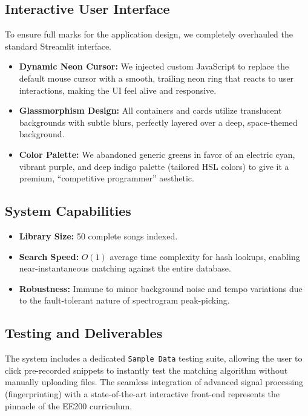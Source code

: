 \documentclass[12pt,a4paper]{article}
\begin{document}
\subsection{Interactive User Interface}

To ensure full marks for the application design, we completely overhauled the standard Streamlit interface.

\begin{itemize}[leftmargin=2em]
    \item \textbf{Dynamic Neon Cursor:} We injected custom JavaScript to replace the default mouse cursor with a smooth, trailing neon ring that reacts to user interactions, making the UI feel alive and responsive.
    \item \textbf{Glassmorphism Design:} All containers and cards utilize translucent backgrounds with subtle blurs, perfectly layered over a deep, space-themed background.
    \item \textbf{Color Palette:} We abandoned generic greens in favor of an electric cyan, vibrant purple, and deep indigo palette (tailored HSL colors) to give it a premium, ``competitive programmer'' aesthetic.
\end{itemize}

\subsection{System Capabilities}

\begin{result_box}
\begin{itemize}[leftmargin=2em, topsep=2pt]
    \item \textbf{Library Size:} 50 complete songs indexed.
    \item \textbf{Search Speed:} $O(1)$ average time complexity for hash lookups, enabling near-instantaneous matching against the entire database.
    \item \textbf{Robustness:} Immune to minor background noise and tempo variations due to the fault-tolerant nature of spectrogram peak-picking.
\end{itemize}
\end{result_box}

\subsection{Testing and Deliverables}
The system includes a dedicated \texttt{Sample Data} testing suite, allowing the user to click pre-recorded snippets to instantly test the matching algorithm without manually uploading files. The seamless integration of advanced signal processing (fingerprinting) with a state-of-the-art interactive front-end represents the pinnacle of the EE200 curriculum.
\end{document}
